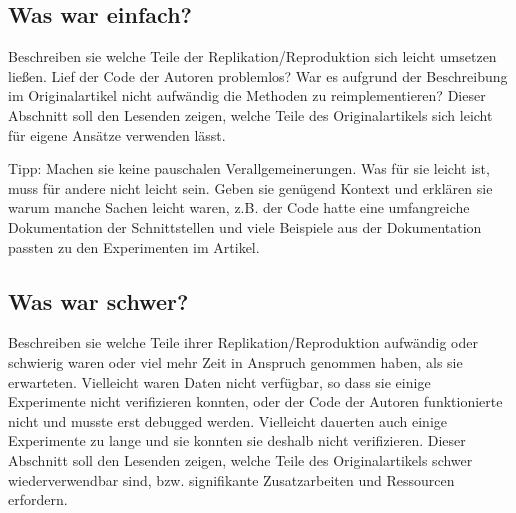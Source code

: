\documentclass[DIV=13,fontsize=11pt]{scrartcl}
\begin{document}


\subsection{Was war einfach?}
Beschreiben sie welche Teile der Replikation/Reproduktion sich leicht umsetzen ließen.
Lief der Code der Autoren problemlos? War es aufgrund der Beschreibung im Originalartikel nicht aufwändig die Methoden zu reimplementieren?
Dieser Abschnitt soll den Lesenden zeigen, welche Teile des Originalartikels sich leicht für eigene Ansätze verwenden lässt.


Tipp: Machen sie keine pauschalen Verallgemeinerungen. Was für sie leicht ist, muss für andere nicht leicht sein. Geben sie genügend Kontext und erklären sie warum manche Sachen leicht waren, z.B. der Code hatte eine umfangreiche Dokumentation der Schnittstellen und viele Beispiele aus der Dokumentation passten zu den Experimenten im Artikel.


\subsection{Was war schwer?}
Beschreiben sie welche Teile ihrer Replikation/Reproduktion aufwändig oder schwierig waren oder viel mehr Zeit in Anspruch genommen haben, als sie erwarteten.
Vielleicht waren Daten nicht verfügbar, so dass sie einige Experimente nicht verifizieren konnten, oder der Code der Autoren funktionierte nicht und musste erst debugged werden.
Vielleicht dauerten auch einige Experimente zu lange und sie konnten sie deshalb nicht verifizieren.
Dieser Abschnitt soll den Lesenden zeigen, welche Teile des Originalartikels schwer wiederverwendbar sind, bzw. signifikante Zusatzarbeiten und Ressourcen erfordern.
\end{document}
